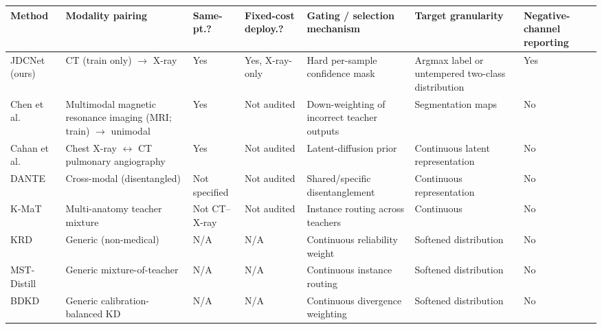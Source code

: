 \documentclass[pdflatex,sn-vancouver,Numbered]{sn-jnl}
\begin{document}
\begin{minipage}{\textwidth}
\centering
\scriptsize
\setlength{\tabcolsep}{2.5pt}
\renewcommand{\arraystretch}{0.92}
\begin{tabularx}{\textwidth}{@{}>{\raggedright\arraybackslash\hspace{0pt}}p{}>{\raggedright\arraybackslash\hspace{0pt}}p{}>{\raggedright\arraybackslash\hspace{0pt}}p{}>{\raggedright\arraybackslash\hspace{0pt}}p{}>{\raggedright\arraybackslash\hspace{0pt}}p{}>{\raggedright\arraybackslash\hspace{0pt}}p{}>{\raggedright\arraybackslash\hspace{0pt}}X@{}}
\toprule
Method & Modality pairing & Same-pt.? & Fixed-cost deploy.? & Gating / selection mechanism & Target granularity & Negative-channel reporting \\
\midrule
JDCNet (ours) & CT (train only) $\to$ X-ray & Yes & Yes, X-ray-only & Hard per-sample confidence mask & Argmax label or untempered two-class distribution & Yes \\
Chen et al.~ & Multimodal magnetic resonance imaging (MRI; train) $\to$ unimodal & Yes & Not audited & Down-weighting of incorrect teacher outputs & Segmentation maps & No \\
Cahan et al.~ & Chest X-ray $\leftrightarrow$ CT pulmonary angiography & Yes & Not audited & Latent-diffusion prior & Continuous latent representation & No \\
DANTE~ & Cross-modal (disentangled) & Not specified & Not audited & Shared/\allowbreak specific disentanglement & Continuous representation & No \\
K-MaT~ & Multi-anatomy teacher mixture & Not CT--X-ray & Not audited & Instance routing across teachers & Continuous & No \\
KRD~ & Generic (non-medical) & N/A & N/A & Continuous reliability weight & Softened distribution & No \\
MST-Distill~ & Generic mixture-of-teacher & N/A & N/A & Continuous instance routing & Softened distribution & No \\
BDKD~ & Generic calibration-balanced KD & N/A & N/A & Continuous divergence weighting & Softened distribution & No \\
\bottomrule
\end{tabularx}
\end{minipage}
\clearpage
\end{document}
